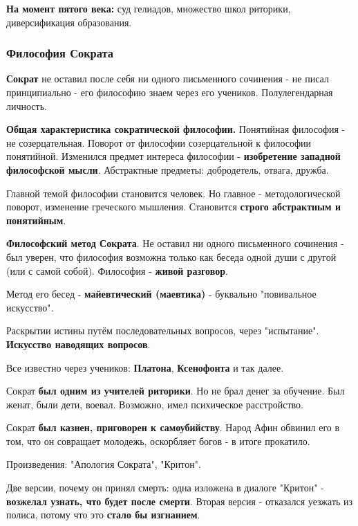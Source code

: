 \documentclass{article}
\begin{document}
\begin{flushleft}
\textbf{На момент пятого века:} суд гелиадов, множество школ риторики, диверсификация образования.

\subsubsection{Философия Сократа}

\textbf{Сократ} не оставил после себя ни одного письменного сочинения - не писал принципиально - его философию знаем через его учеников. Полулегендарная личность.

\hfill

\textbf{Общая характеристика сократической философии.} Понятийная философия - не созерцательная. Поворот от философии созерцательной к философии понятийной. Изменился предмет интереса философии - \textbf{изобретение западной философской мысли}. Абстрактные предметы: добродетель, отвага, дружба.

\hfill

Главной темой философии становится человек. Но главное - методологической поворот, изменение греческого мышления. Становится \textbf{строго абстрактным и понятийным}.

\hfill

\textbf{Философский метод Сократа}. Не оставил ни одного письменного сочинения - был уверен, что философия возможна только как беседа одной души с другой (или с самой собой). Философия - \textbf{живой разговор}.

Метод его бесед - \textbf{майевтический (маевтика)} - буквально "повивальное искусство".

Раскрытии истины путём последовательных вопросов, через "испытание". \textbf{Искусство наводящих вопросов}.

\hfill

Все известно через учеников: \textbf{Платона}, \textbf{Ксенофонта} и так далее.

\hfill

Сократ \textbf{был одним из учителей риторики}. Но не брал денег за обучение. Был женат, были дети, воевал. Возможно, имел психическое расстройство.

\hfill

Сократ \textbf{был казнен, приговорен к самоубийству}. Народ Афин обвинил его в том, что он совращает молодежь, оскорбляет богов - в итоге прокатило.

Произведения: "Апология Сократа", "Критон".

Две версии, почему он принял смерть: одна изложена в диалоге "Критон" - \textbf{возжелал узнать, что будет после смерти}. Вторая версия - отказался уезжать из полиса, потому что это \textbf{стало бы изгнанием}.


\end{flushleft}
\end{document}
